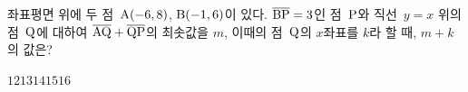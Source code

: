 좌표평면 위에 두 점~$\mathrm{A}(-6{,}\mkern3mu 8)$, $\mathrm{B}(-1{,}\mkern3mu 6)$이 있다. $\overline{\mathrm{BP}}=3$인 점~$\mathrm{P}$와 직선~$y=x$ 위의 점~$\mathrm{Q}$에 대하여 $\overline{\mathrm{AQ}}+\overline{\mathrm{QP}}$의 최솟값을 $m$, 이때의 점~$\mathrm{Q}$의 $x$좌표를 $k$라 할 때, $m+k$의 값은?
\begin{choices32}{$12$}{$13$}{$14$}{$15$}{$16$}\end{choices32}
